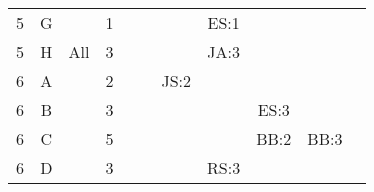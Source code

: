 \documentclass[12pt]{article}
\begin{document}
\begin{table}[H]
\begin{tabular}{@{}c|c|c|c|ccccccc@{}}
5     & G    &            & 1                                                      &                                                 &                                                 &                                                  & ES:1                                             &                                                  &                                                  &                                                  \\
5     & H    & All        & 3                                                      &                                                 &                                                 &                                                  & JA:3                                             &                                                  &                                                  &                                                  \\
6     & A    &            & 2                                                      &                                                 &                                                 & JS:2                                             &                                                  &                                                  &                                                  &                                                  \\
6     & B    &            & 3                                                      &                                                 &                                                 &                                                  &                                                  & ES:3                                             &                                                  &                                                  \\ 
6     & C    &            & 5                                                      &                                                 &                                                 &                                                  &                                                  & BB:2                                             & BB:3                                             &                                                  \\ 
6     & D    &            & 3                                                      &                                                 &                                                 &                                                  & RS:3                                             &                                                  &                                                  &                                                  \\ 

\end{tabular}
\end{table}
\end{document}
